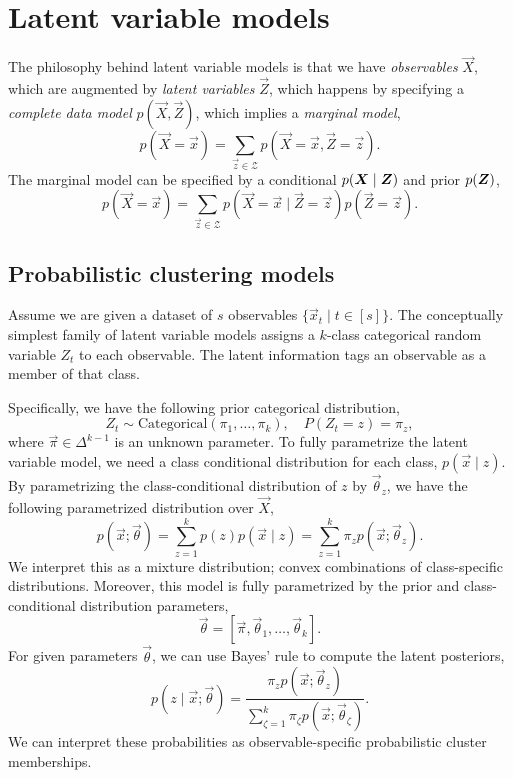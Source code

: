 \section{Latent variable models}

The philosophy behind latent variable models is that we have \textit{observables} $\vec{X}$, which
are augmented by \textit{latent variables} $\vec{Z}$, which happens by specifying a
\textit{complete data model} $p(\vec{X}, \vec{Z})$, which implies a \textit{marginal model}, \[
    p(\vec{X} = \vec{x}) = \sum_{\vec{z} \in \mathcal{Z}} p(\vec{X} = \vec{x}, \vec{Z} = \vec{z}).
\]
The marginal model can be specified by a conditional $p(\bm{X} \mid \bm{Z})$ and prior
$p(\bm{Z})$, \[
    p(\vec{X} = \vec{x}) = \sum_{\vec{z} \in \mathcal{Z}} p(\vec{X} = \vec{x} \mid \vec{Z} = \vec{z}) p(\vec{Z} = \vec{z}).
\]

\subsection{Probabilistic clustering models}

Assume we are given a dataset of $s$ observables $\{ \vec{x}_t \mid t \in [s] \}$. The conceptually
simplest family of latent variable models assigns a $k$-class categorical random variable $Z_t$ to
each observable. The latent information tags an observable as a member of that class.

Specifically, we have the following prior categorical distribution, \[
    Z_t \sim \mathrm{Categorical}(\pi_1, \ldots, \pi_k), \quad P(Z_t = z) = \pi_z,
\]
where $\vec{\pi} \in \Delta^{k-1}$ is an unknown parameter. To fully parametrize the latent variable model, we need a class
conditional distribution for each class, $p(\vec{x} \mid z)$. By parametrizing the
class-conditional distribution of $z$ by $\vec{\theta}_z$, we have the following parametrized
distribution over $\vec{X}$, \[
    p(\vec{x}; \vec{\theta}) = \sum_{z=1}^{k} p(z) p(\vec{x} \mid z) = \sum_{z=1}^{k} \pi_z p(\vec{x}; \vec{\theta}_z).
\]
We interpret this as a mixture distribution; convex combinations of class-specific distributions.
Moreover, this model is fully parametrized by the prior and class-conditional distribution
parameters, \[
    \vec{\theta} = [\vec{\pi}, \vec{\theta}_1, \ldots, \vec{\theta}_k].
\]
For given parameters $\vec{\theta}$, we can use Bayes' rule to compute the latent posteriors, \[
    p(z \mid \vec{x}; \vec{\theta}) = \frac{\pi_z p(\vec{x}; \vec{\theta}_z)}{\sum_{\zeta=1}^{k} \pi_{\zeta} p(\vec{x}; \vec{\theta}_{\zeta})}.
\]
We can interpret these probabilities as observable-specific probabilistic cluster memberships.

